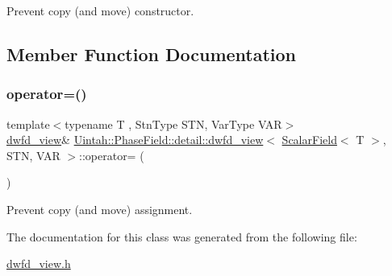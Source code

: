 Prevent copy (and move) constructor. 



\subsection{Member Function Documentation}
\mbox{\label{classUintah_1_1PhaseField_1_1detail_1_1dwfd__view_3_01ScalarField_3_01T_01_4_00_01STN_00_01VAR_01_4_ae96d77062c8797072749a962f002a03c}} 
\subsubsection{\texorpdfstring{operator=()}{operator=()}}
{\footnotesize\ttfamily template$<$typename T , Stn\+Type S\+TN, Var\+Type V\+AR$>$ \\
\hyperlink{classUintah_1_1PhaseField_1_1detail_1_1dwfd__view}{dwfd\+\_\+view}\& \hyperlink{classUintah_1_1PhaseField_1_1detail_1_1dwfd__view}{Uintah\+::\+Phase\+Field\+::detail\+::dwfd\+\_\+view}$<$ \hyperlink{structUintah_1_1PhaseField_1_1ScalarField}{Scalar\+Field}$<$ T $>$, S\+TN, V\+AR $>$\+::operator= (\begin{DoxyParamCaption}\item[{const \hyperlink{classUintah_1_1PhaseField_1_1detail_1_1dwfd__view}{dwfd\+\_\+view}$<$ \hyperlink{structUintah_1_1PhaseField_1_1ScalarField}{Scalar\+Field}$<$ T $>$, S\+TN, V\+AR $>$ \&}]{ }\end{DoxyParamCaption})\hspace{0.3cm}{\ttfamily [delete]}}



Prevent copy (and move) assignment. 



The documentation for this class was generated from the following file\+:\begin{DoxyCompactItemize}
\item 
\hyperlink{dwfd__view_8h}{dwfd\+\_\+view.\+h}\end{DoxyCompactItemize}
